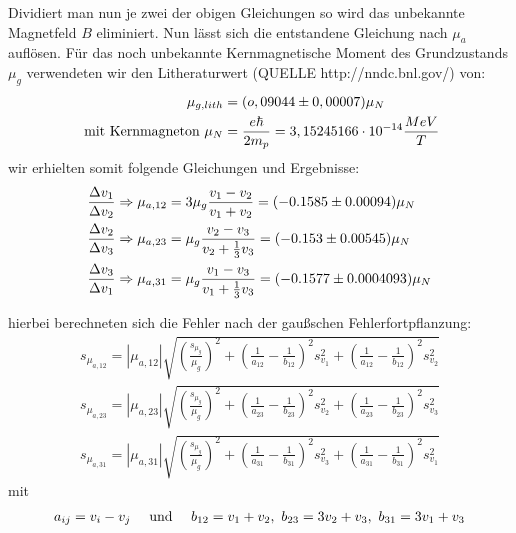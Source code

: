\documentclass[12pt]{article}
\begin{document}
Dividiert man nun je zwei der obigen Gleichungen so wird das unbekannte Magnetfeld $B$ eliminiert. Nun lässt sich die entstandene Gleichung nach $\mu_a$
auflösen. Für das noch unbekannte Kernmagnetische Moment des Grundzustands $\mu_g$ verwendeten wir den Litheraturwert (QUELLE http://nndc.bnl.gov/) von:
\begin {align*}
 \mu_{g,lith} &= (o,09044 \pm 0,00007) \mu_N \\
 \textnormal{ mit Kernmagneton } \mu_N &= \frac{e \hbar}{2 m_p} = 3,15245166 \cdot 10^{-14} \frac{MeV}{T}
\end {align*}
wir erhielten somit folgende Gleichungen und Ergebnisse:
\begin{align}
 \notag \frac{\Delta v_1}{\Delta v_2} \Rightarrow \mu_{a,12} &= 3\mu_g \frac{v_1 - v_2}{v_1 + v_2} = (-0.1585 \pm 0.00094) \mu_N \\
 \notag \frac{\Delta v_2}{\Delta v_3} \Rightarrow \mu_{a,23} &= \mu_g \frac{v_2 - v_3}{v_2 + \frac{1}{3}v_3} = (-0.153 \pm 0.00545) \mu_N \\
 \notag \frac{\Delta v_3}{\Delta v_1} \Rightarrow \mu_{a,31} &= \mu_g \frac{v_1 - v_3}{v_1 + \frac{1}{3}v_3} = (-0.1577 \pm 0.0004093) \mu_N 
\end{align}

hierbei berechneten sich die Fehler nach der gaußschen Fehlerfortpflanzung:
\begin{align*}
 s_{\mu_{a,12}} = \left| \mu _{a,12} \right| \sqrt{\left( \frac{s_{\mu_g}}{\mu_g} \right) ^2 + \left( \frac{1}{a_{12}} - \frac{1}{b_{12}} \right) ^2 s_{v_1}^2 +
    \left( \frac{1}{a_{12}} - \frac{1}{b_{12}} \right) ^2 s_{v_2}^2} \\
 s_{\mu_{a,23}} = \left| \mu _{a,23} \right| \sqrt{\left( \frac{s_{\mu_g}}{\mu_g} \right) ^2 + \left( \frac{1}{a_{23}} - \frac{1}{b_{23}} \right) ^2 s_{v_2}^2 +
    \left( \frac{1}{a_{23}} - \frac{1}{b_{23}} \right) ^2 s_{v_3}^2} \\
 s_{\mu_{a,31}} = \left| \mu _{a,31} \right| \sqrt{\left( \frac{s_{\mu_g}}{\mu_g} \right) ^2 + \left( \frac{1}{a_{31}} - \frac{1}{b_{31}} \right) ^2 s_{v_3}^2 +
    \left( \frac{1}{a_{31}} - \frac{1}{b_{31}} \right) ^2 s_{v_1}^2}
\end{align*}
mit
\begin{align*}
 a_{ij} = v_i - v_j\hspace{10pt}\textnormal{ und }\hspace{10pt}b_{12} = v_1 + v_2, ~ b_{23} = 3v_2+v_3,~b_{31}=3v_1+v_3
\end{align*}
\end{document}
